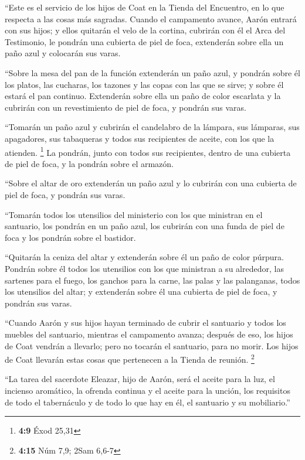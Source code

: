  ``Este es el servicio de los hijos de Coat en la Tienda
del Encuentro, en lo que respecta a las cosas más sagradas.
 Cuando el campamento avance, Aarón entrará con sus hijos;
y ellos quitarán el velo de la cortina, cubrirán con él el Arca del
Testimonio,  le pondrán una cubierta de piel de foca,
extenderán sobre ella un paño azul y colocarán sus varas.

 ``Sobre la mesa del pan de la función extenderán un paño
azul, y pondrán sobre él los platos, las cucharas, los tazones y las
copas con las que se sirve; y sobre él estará el pan continuo.
 Extenderán sobre ella un paño de color escarlata y la
cubrirán con un revestimiento de piel de foca, y pondrán sus varas.

 ``Tomarán un paño azul y cubrirán el candelabro de la
lámpara, sus lámparas, sus apagadores, sus tabaqueras y todos sus
recipientes de aceite, con los que la atienden. \footnote{\textbf{4:9}
  Éxod 25,31}  La pondrán, junto con todos sus
recipientes, dentro de una cubierta de piel de foca, y la pondrán sobre
el armazón.

 ``Sobre el altar de oro extenderán un paño azul y lo
cubrirán con una cubierta de piel de foca, y pondrán sus varas.

 ``Tomarán todos los utensilios del ministerio con los
que ministran en el santuario, los pondrán en un paño azul, los cubrirán
con una funda de piel de foca y los pondrán sobre el bastidor.

 ``Quitarán la ceniza del altar y extenderán sobre él un
paño de color púrpura.  Pondrán sobre él todos los
utensilios con los que ministran a su alrededor, las sartenes para el
fuego, los ganchos para la carne, las palas y las palanganas, todos los
utensilios del altar; y extenderán sobre él una cubierta de piel de
foca, y pondrán sus varas.

 ``Cuando Aarón y sus hijos hayan terminado de cubrir el
santuario y todos los muebles del santuario, mientras el campamento
avanza; después de eso, los hijos de Coat vendrán a llevarlo; pero no
tocarán el santuario, para no morir. Los hijos de Coat llevarán estas
cosas que pertenecen a la Tienda de reunión. \footnote{\textbf{4:15} Núm
  7,9; 2Sam 6,6-7}

 ``La tarea del sacerdote Eleazar, hijo de Aarón, será el
aceite para la luz, el incienso aromático, la ofrenda continua y el
aceite para la unción, los requisitos de todo el tabernáculo y de todo
lo que hay en él, el santuario y su mobiliario.''

